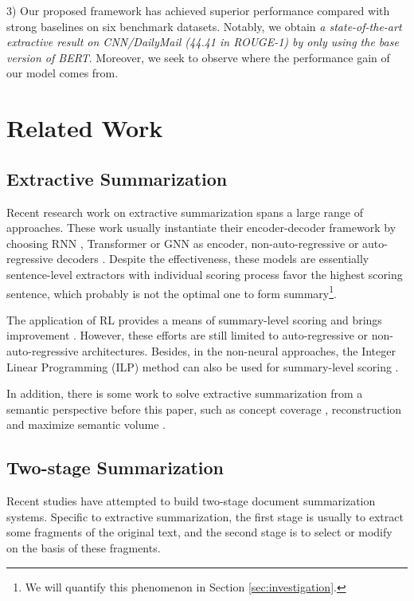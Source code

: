3) Our proposed framework has achieved superior performance compared with strong baselines on six benchmark datasets. Notably, we obtain \textit{a state-of-the-art extractive result on CNN/DailyMail (44.41 in ROUGE-1) by only using the base version of BERT}. Moreover, we seek to observe where the performance gain of our model comes from.

\section{Related Work}

\subsection{Extractive Summarization}

Recent research work on extractive summarization spans a large range of approaches.
These work usually instantiate their encoder-decoder framework by choosing RNN \cite{zhou2018neural}, Transformer \cite{zhong2019closer, wang2019exploring} or GNN \cite{wang2020heterogeneous} as encoder, non-auto-regressive \cite{narayan2018ranking, arumae2018reinforced} or auto-regressive decoders \cite{jadhav2018extractive, liu2019text}. Despite the effectiveness, these models are essentially sentence-level extractors with individual scoring process favor the highest scoring sentence, which probably is not the optimal one to form summary\footnote{We will quantify this phenomenon in Section \ref{sec:investigation}.}.

The application of RL provides a means of summary-level scoring and brings improvement \cite{narayan2018ranking, bae2019summary}. However, these efforts are still limited to auto-regressive or non-auto-regressive architectures. Besides, in the non-neural approaches, the Integer Linear Programming (ILP) method can also be used for summary-level scoring \cite{wan2015multi}.

In addition, there is some work to solve extractive summarization from a semantic perspective before this paper, such as concept coverage \cite{gillick2009scalable}, reconstruction \cite{miao2016language} and maximize semantic volume \cite{yogatama2015extractive}.

\subsection{Two-stage Summarization}
Recent studies \cite{alyguliyev2009two, galanis2010extractive, zhang2019pretraining} have attempted to build two-stage document summarization systems. Specific to extractive summarization, the first stage is usually to extract some fragments of the original text, and the second stage is to select or modify on the basis of these fragments.

